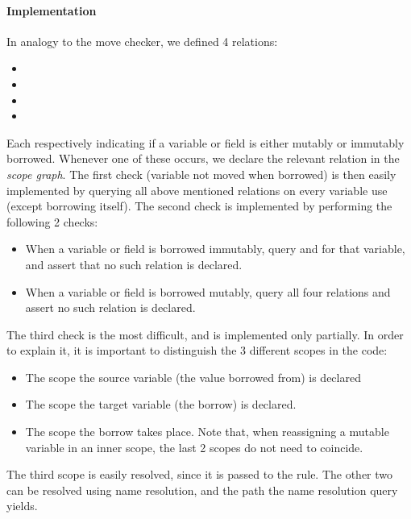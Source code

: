 \paragraph{Implementation}

In analogy to the move checker, we defined 4 relations:
\begin{itemize}
	\item {}
	\item {}
	\item {}
	\item {}
\end{itemize}

Each respectively indicating if a variable or field is either mutably or immutably borrowed. Whenever one of these occurs, we declare the relevant relation in the \textit{scope graph}. The first check (variable not moved when borrowed) is then easily implemented by querying all above mentioned relations on every variable use (except borrowing itself). The second check is implemented by performing the following 2 checks:
\begin{itemize}
    \item When a variable or field is borrowed immutably, query  and  for that variable, and assert that no such relation is declared.
    \item When a variable or field is borrowed mutably, query all four relations and assert no such relation is declared.
\end{itemize}

The third check is the most difficult, and is implemented only partially. In order to explain it, it is important to distinguish the 3 different scopes in the code:
\begin{itemize}
    \item The scope the source variable (the value borrowed from) is declared
    \item The scope the target variable (the borrow) is declared.
    \item The scope the borrow takes place. Note that, when reassigning a mutable variable in an inner scope, the last 2 scopes do not need to coincide.
\end{itemize}

The third scope is easily resolved, since it is passed to the  rule. The other two can be resolved using name resolution, and the path the name resolution query yields.

